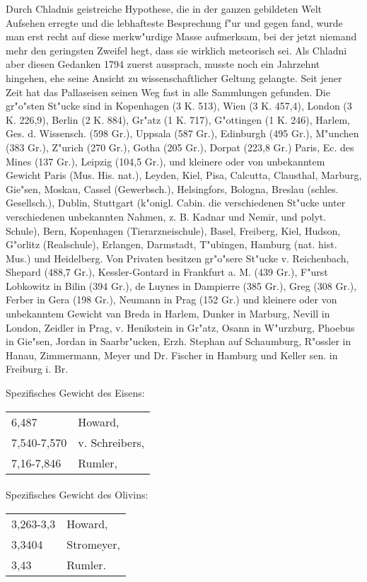 \documentclass[a4paper, 11pt, oneside]{article}
\begin{document}
Durch Chladnis geistreiche Hypothese, die in der ganzen gebildeten Welt Aufsehen erregte und die lebhafteste Besprechung f"ur und gegen fand, wurde man erst recht auf diese merkw"urdige Masse aufmerksam, bei der jetzt niemand mehr den geringsten Zweifel hegt, dass sie wirklich meteorisch sei. Als Chladni aber diesen Gedanken 1794 zuerst aussprach, musste noch ein Jahrzehnt hingehen, ehe seine Ansicht zu wissenschaftlicher Geltung gelangte. Seit jener Zeit hat das Pallaseisen seinen Weg fast in alle Sammlungen gefunden. Die gr"o"sten St"ucke sind in Kopenhagen (3 K. 513), Wien (3 K. 457,4), London (3 K. 226,9), Berlin (2 K. 884), Gr"atz (1 K. 717), G"ottingen (1 K. 246), Harlem, Ges. d. Wissensch. (598 Gr.), Uppsala (587 Gr.), Edinburgh (495 Gr.), M"unchen (383 Gr.), Z"urich (270 Gr.), Gotha (205 Gr.), Dorpat (223,8 Gr.) Paris, Ec. des Mines (137 Gr.), Leipzig (104,5 Gr.), und kleinere oder von unbekanntem Gewicht Paris (Mus. His. nat.), Leyden, Kiel, Pisa, Calcutta, Clausthal, Marburg, Gie"sen, Moskau, Cassel (Gewerbsch.), Helsingfors, Bologna, Breslau (schles. Gesellsch.), Dublin, Stuttgart (k"onigl. Cabin. die verschiedenen St"ucke unter verschiedenen unbekannten Nahmen, z. B. Kadnar und Nemir, und polyt. Schule), Bern, Kopenhagen (Tierarzneischule), Basel, Freiberg, Kiel, Hudson, G"orlitz (Realschule), Erlangen, Darmstadt, T"ubingen, Hamburg (nat. hist. Mus.) und Heidelberg. Von Privaten besitzen gr"o"sere St"ucke v. Reichenbach, Shepard (488,7 Gr.), Kessler-Gontard in Frankfurt a. M. (439 Gr.), F"urst Lobkowitz in Bilin (394 Gr.), de Luynes in Dampierre (385 Gr.), Greg (308 Gr.), Ferber in Gera (198 Gr.), Neumann in Prag (152 Gr.) und kleinere oder von unbekanntem Gewicht van Breda in Harlem, Dunker in Marburg, Nevill in London, Zeidler in Prag, v. Henikstein in Gr"atz, Osann in W"urzburg, Phoebus in Gie"sen, Jordan in Saarbr"ucken, Erzh. Stephan auf Schaumburg, R"ossler in Hanau, Zimmermann, Meyer und Dr. Fischer in Hamburg und Keller sen. in Freiburg i. Br.

Spezifisches Gewicht des Eisens:  
\begin{table}[!ht]
    \centering
    \begin{tabular}{l l}
        6,487 & Howard,\\
        7,540-7,570 & v. Schreibers,\\
        7,16-7,846 & Rumler,
    \end{tabular}
\end{table}
\paragraph{}
Spezifisches Gewicht des Olivins:  
\begin{table}[!ht]
    \centering
    \begin{tabular}{l l}
        3,263-3,3 & Howard,\\
        3,3404 & Stromeyer,\\
        3,43 & Rumler.
    \end{tabular}
\end{table}
\end{document}

